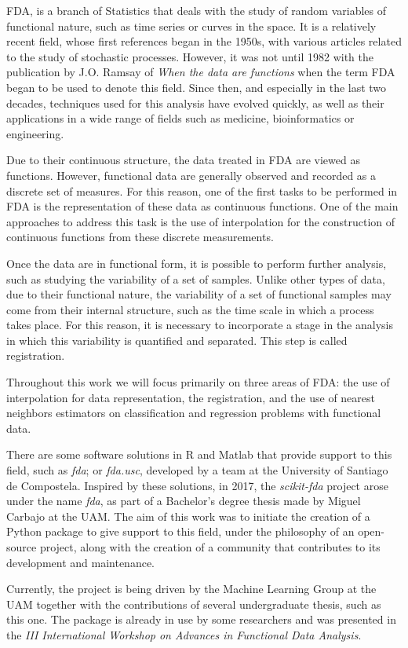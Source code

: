 
\ac{FDA}, is a branch of
Statistics that deals with the study of random variables of
functional nature, such as time series or curves in the
space. It is a relatively recent field, whose first references
began in the 1950s, with various articles related to the study of stochastic
processes. However, it was not until 1982 with the publication by
J.O. Ramsay of \textit{When the data are functions}\cite{Ramsay1982} when the
term \acs{FDA} began to be used to denote this field.
Since then, and especially in the last two decades, techniques used for this analysis
have evolved quickly, as well as their applications in a wide range of fields
such as medicine, bioinformatics or engineering.

Due to their continuous structure, the data treated in \acs{FDA} are viewed as functions.
However, functional data are generally observed and recorded as a discrete set of
measures. For this reason, one of the first tasks to be performed in \acs{FDA} is the
representation of these data as continuous functions.
One of the main approaches to address this task is the use of interpolation
for the construction of continuous functions from these discrete measurements.

Once the data are in functional form, it is possible to perform
further analysis, such as studying the variability of a set of samples.
Unlike other types of data, due to their functional nature, the variability of
a set of functional samples may come from their internal structure, such as the time scale
in which a process takes place. For this reason, it is necessary to
incorporate a stage in the analysis in which this variability is quantified
and separated. This step is called registration.

Throughout this work we will focus primarily on three areas of \acs{FDA}:
the use of interpolation for data representation, the registration, and the use
of nearest neighbors estimators on classification and regression problems with
functional data.

There are some software solutions in R and Matlab that provide support to this
field, such as \textit{fda}\cite{fda-r}\cite{Ramsay2009};
or \textit{fda.usc}\cite{FdaUsc}, developed by a team at the
University of Santiago de Compostela.
Inspired by these solutions, in 2017, the \textit{scikit-fda} project arose
under the name \textit{fda}\cite{FDA2018}, as part of a Bachelor's degree thesis
made by Miguel Carbajo at the UAM. The aim of this work was to initiate the creation of a
Python package to give support to this field, under the philosophy of an open-source
project, along with the creation of a community that contributes to its development
and maintenance.

Currently, the project is being driven by the Machine
Learning Group at the UAM together with the contributions of several
undergraduate thesis, such as this one.
The package is already in use by some researchers and was presented
in the \textit{III International Workshop on Advances in Functional Data
Analysis}\cite{ramos-carrenoScikitfdaPythonPackage2019}.
